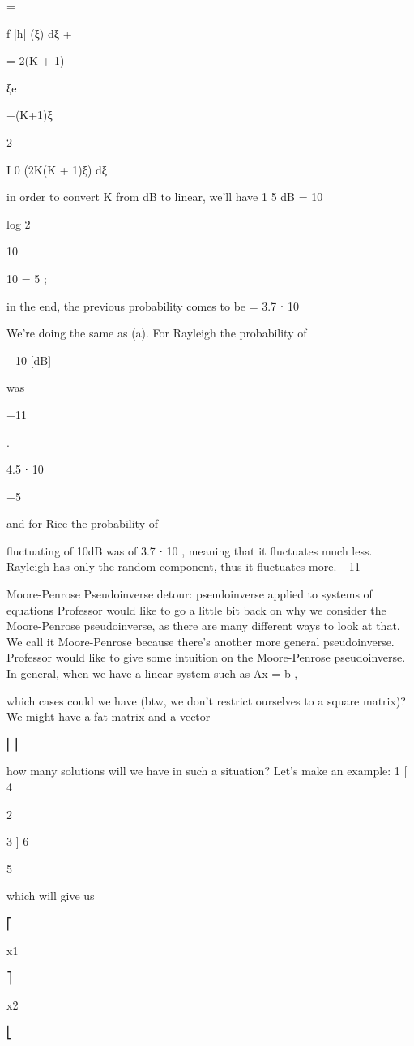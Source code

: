 {{{{= \int

f |h| (ξ) dξ
+\infty

= 2(K + 1) \int

ξe

−(K+1)ξ

2

I 0 (2\sqrt K(K + 1)ξ) dξ


in order to convert K from dB to linear, we'll have 1 5 dB = 10

log 2

10

10 = 5 ;

in the end, the previous probability comes to be
= 3.7 ⋅ 10

We're doing the same as (a).
For Rayleigh the probability of

−10 [dB]

was

−11

.

4.5 ⋅ 10

−5

and for Rice the probability of

fluctuating of 10dB was of 3.7 ⋅ 10 , meaning that it fluctuates much less.
Rayleigh has only the random component, thus it fluctuates more.
−11

Moore-Penrose Pseudoinverse detour: pseudoinverse applied to systems of equations Professor would like to go a little bit back on why we consider the Moore-Penrose pseudoinverse, as there are many different ways to look at that.
We call it Moore-Penrose because there's another more general pseudoinverse. Professor would like to give some intuition on the Moore-Penrose pseudoinverse.
In general, when we have a linear system such as Ax = b ,

which cases could we have (btw, we don't restrict ourselves to a square matrix)?
We might have a fat matrix and a vector

⎢⎥

how many solutions will we have in such a situation? Let's make an example:
1
[
4

2

3
]
6

5

which will give us
{

⎡

x1

⎤

x2

⎣

}}}}}
